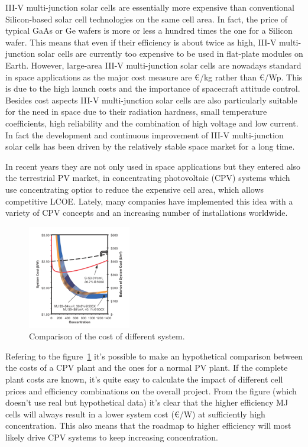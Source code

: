\documentclass[11pt]{article} %
\begin{document}
III-V multi-junction solar  cells  are essentially more expensive than conventional Silicon-based solar cell technologies on the same cell area. In fact, the price of typical GaAs or Ge wafers is more or less a hundred times the one for a Silicon wafer. This means that even if their efficiency is about twice as high, III-V multi-junction solar cells are currently too expensive to be used in flat-plate modules on Earth.   However, large-area III-V multi-junction solar cells are nowadays standard in space applications as the major cost measure are €/kg rather than €/Wp. This is due to the high launch costs and the importance of spacecraft attitude control. Besides cost aspects III-V multi-junction solar cells  are  also  particularly  suitable  for  the  need  in  space  due  to  their  radiation  hardness,  small temperature coefficients, high reliability and the combination of high voltage and low current. In fact the development and continuous improvement of III-V multi-junction solar cells has been driven by the relatively stable space market for a long time.  





 In recent years they are not  only used in space applications but they entered also the terrestrial PV market, in  concentrating  photovoltaic  (CPV)  systems which use  concentrating  optics  to  reduce  the  expensive  cell  area,  which  allows  competitive  LCOE.  Lately, many  companies  have  implemented  this  idea  with  a  variety  of  CPV  concepts  and  an  increasing number of installations worldwide.   

 \begin{figure}
	\centering
	\includegraphics[width=0.4\textwidth]{img/sadasd.png}
	\caption{Comparison of the cost of different system.\label{fig:aa}}
\end{figure}
Refering to the figure~\ref{fig:aa} it’s possible to make an hypothetical comparison between the costs of a CPV plant and the ones for a normal PV plant. If the complete plant costs are known, it’s quite easy to calculate the impact of different cell prices and efficiency combinations on the overall project. From the figure (which doesn’t use real but hypothetical data) it’s clear that the higher efficiency MJ cells will always result in a lower system cost (€/W) at sufficiently high concentration. This also means that the roadmap to higher efficiency will most likely drive CPV systems to keep increasing concentration.   
\end{document}
